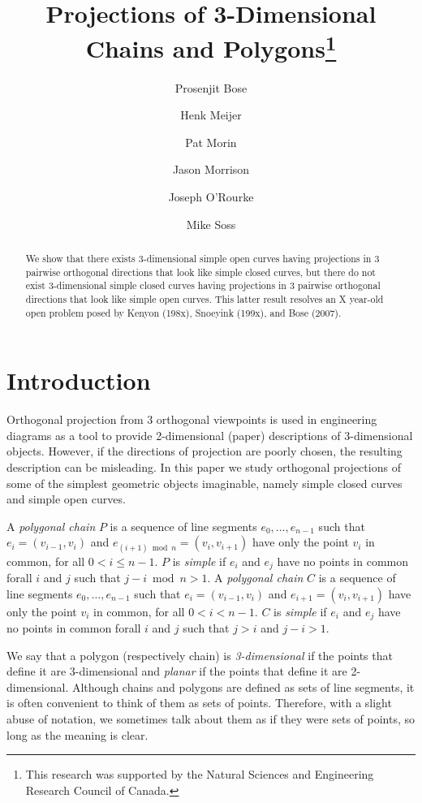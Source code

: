 \documentclass[12pt]{article}
\title{Projections of 3-Dimensional Chains and Polygons\thanks{This research was supported by the Natural Sciences and Engineering Research Council of Canada.}}
\author{Prosenjit Bose \and
	Henk Meijer \and
	Pat Morin \and
	Jason Morrison \and 
	Joseph O'Rourke \and
	Mike Soss}
\date{}
\begin{document}
\maketitle

\begin{abstract}
We show that there exists 3-dimensional simple open curves having
projections in 3 pairwise orthogonal directions that look like simple
closed curves, but there do not exist 3-dimensional simple closed
curves having projections in 3 pairwise orthogonal directions that
look like simple open curves. This latter result resolves an X year-old
open problem posed by Kenyon (198x), Snoeyink (199x), and Bose (2007).
\end{abstract}

\section{Introduction}

Orthogonal projection from 3 orthogonal viewpoints is used in
engineering diagrams as a tool to provide 2-dimensional (paper)
descriptions of 3-dimensional objects.  However, if the directions of
projection are poorly chosen, the resulting description can be
misleading.  In this paper we study orthogonal projections of some of
the simplest geometric objects imaginable, namely simple closed curves and
simple open curves.  

A \emph{polygonal chain} $P$ is a sequence of line segments
$e_0,\ldots,e_{n-1}$ such that $e_i=(v_{i-1},v_i)$ and $e_{(i+1)\bmod
n}=(v_{i},v_{i+1})$ have only the point $v_i$ in common, for all $0 <
i\le n-1$. $P$ is {\em simple} if $e_i$ and $e_j$ have no points in
common forall $i$ and $j$ such that $j-i\bmod n > 1$.  A {\em
polygonal chain} $C$ is a sequence of line segments
$e_{0},\ldots,e_{n-1}$ such that $e_i=(v_{i-1},v_i)$ and
$e_{i+1}=(v_{i},v_{i+1})$ have only the point $v_i$ in common, for all
$0< i< n-1$.  $C$ is {\em simple} if $e_i$ and $e_j$ have no points in
common forall $i$ and $j$ such that $j>i$ and $j-i > 1$.

We say that a polygon (respectively chain) is {\em 3-dimensional} if
the points that define it are 3-dimensional and {\em planar} if the
points that define it are 2-dimensional.  Although chains and polygons
are defined as sets of line segments, it is often convenient to think
of them as sets of points.  Therefore, with a slight abuse of
notation, we sometimes talk about them as if they were sets of points,
so long as the meaning is clear.
\end{document}
